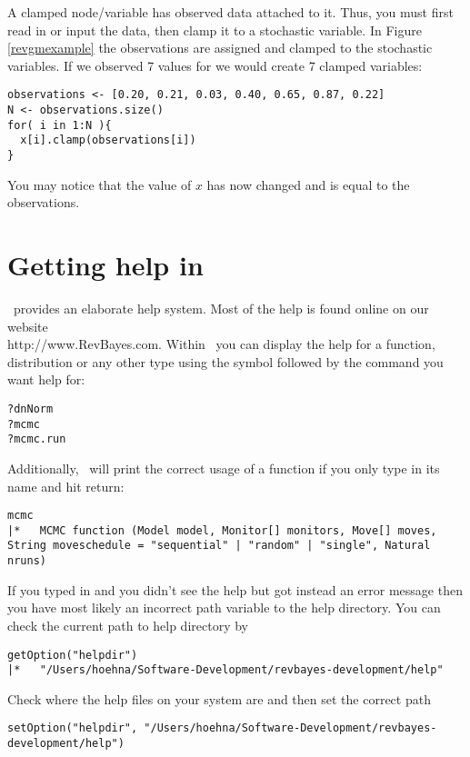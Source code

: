 A clamped node/variable has observed data attached to it. 
Thus, you must first read in or input the data, then clamp it to a stochastic variable. 
In Figure \ref{revgmexample} the observations are assigned and clamped to the stochastic variables.
If we observed 7 values for  we would create 7 clamped variables:
{\tt \begin{snugshade*}
\begin{lstlisting}
observations <- [0.20, 0.21, 0.03, 0.40, 0.65, 0.87, 0.22]
N <- observations.size()
for( i in 1:N ){
  x[i].clamp(observations[i])
}
\end{lstlisting}
\end{snugshade*}}
You may notice that the value of $x$ has now changed and is equal to the observations.



\section{Getting help in \RevBayes}

\RevBayes~provides an elaborate help system. 
Most of the help is found online on our website \\
http://www.RevBayes.com.
Within \RevBayes~you can display the help for a function, distribution or any other type using the  symbol followed by the command you want help for:
{\tt \begin{snugshade*}
\begin{lstlisting}
?dnNorm
?mcmc
?mcmc.run
\end{lstlisting}
\end{snugshade*}}

Additionally, \RevBayes~will print the correct usage of a function if you only type in its name and hit return:
{\tt \small \begin{snugshade*}
\begin{lstlisting}
mcmc
|*   MCMC function (Model model, Monitor[] monitors, Move[] moves, String moveschedule = "sequential" | "random" | "single", Natural nruns)
\end{lstlisting}
\end{snugshade*}}

If you typed in  and you didn't see the help but got instead an error message then you have most likely an incorrect path variable to the help directory.
You can check the current path to help directory by
{\tt \small \begin{snugshade*}
\begin{lstlisting}
getOption("helpdir")
|*   "/Users/hoehna/Software-Development/revbayes-development/help"
\end{lstlisting}
\end{snugshade*}}
Check where the help files on your system are and then set the correct path
{\tt \small \begin{snugshade*}
\begin{lstlisting}
setOption("helpdir", "/Users/hoehna/Software-Development/revbayes-development/help")
\end{lstlisting}
\end{snugshade*}}

